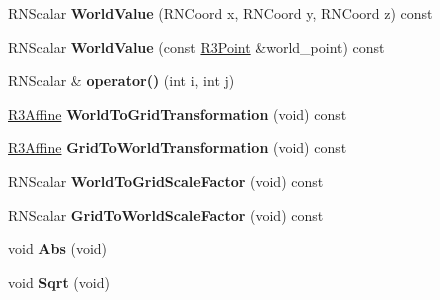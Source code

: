 \begin{DoxyCompactItemize}
\item 
R\+N\+Scalar {\bfseries World\+Value} (R\+N\+Coord x, R\+N\+Coord y, R\+N\+Coord z) const \hypertarget{class_r3_planar_grid_aa0ea274a0618dabef71438c0f3e4299b}{}\label{class_r3_planar_grid_aa0ea274a0618dabef71438c0f3e4299b}

\item 
R\+N\+Scalar {\bfseries World\+Value} (const \hyperlink{class_r3_point}{R3\+Point} \&world\+\_\+point) const \hypertarget{class_r3_planar_grid_abdc980c69aaf4c1c951a78787c1ae0f2}{}\label{class_r3_planar_grid_abdc980c69aaf4c1c951a78787c1ae0f2}

\item 
R\+N\+Scalar \& {\bfseries operator()} (int i, int j)\hypertarget{class_r3_planar_grid_ab52dac56807f53761e16ac1ad0f6479d}{}\label{class_r3_planar_grid_ab52dac56807f53761e16ac1ad0f6479d}

\item 
\hyperlink{class_r3_affine}{R3\+Affine} {\bfseries World\+To\+Grid\+Transformation} (void) const \hypertarget{class_r3_planar_grid_a843e44c883ed1bdef7d2c4c81d660139}{}\label{class_r3_planar_grid_a843e44c883ed1bdef7d2c4c81d660139}

\item 
\hyperlink{class_r3_affine}{R3\+Affine} {\bfseries Grid\+To\+World\+Transformation} (void) const \hypertarget{class_r3_planar_grid_a7a843d10d2c661772bb441a090cb324f}{}\label{class_r3_planar_grid_a7a843d10d2c661772bb441a090cb324f}

\item 
R\+N\+Scalar {\bfseries World\+To\+Grid\+Scale\+Factor} (void) const \hypertarget{class_r3_planar_grid_ad55ac08f098c8fb0a3faa29c9b4e03d8}{}\label{class_r3_planar_grid_ad55ac08f098c8fb0a3faa29c9b4e03d8}

\item 
R\+N\+Scalar {\bfseries Grid\+To\+World\+Scale\+Factor} (void) const \hypertarget{class_r3_planar_grid_a6a5fa18b09982fa7a02534ef4318395a}{}\label{class_r3_planar_grid_a6a5fa18b09982fa7a02534ef4318395a}

\item 
void {\bfseries Abs} (void)\hypertarget{class_r3_planar_grid_a69f5e565059b4fb7cc9ad2471f383550}{}\label{class_r3_planar_grid_a69f5e565059b4fb7cc9ad2471f383550}

\item 
void {\bfseries Sqrt} (void)\hypertarget{class_r3_planar_grid_a484cdedb4228d583d35d43fcd5274a30}{}\label{class_r3_planar_grid_a484cdedb4228d583d35d43fcd5274a30}


\end{DoxyCompactItemize}
